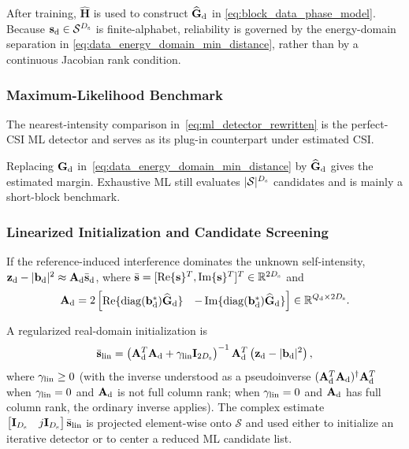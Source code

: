 \documentclass[journal]{IEEEtran}
\begin{document}
After training, $\widehat{\mathbf H}$ is used to construct
$\widehat{\mathbf G}_{\rm d}$ in \eqref{eq:block_data_phase_model}. Because
$\mathbf s_{\rm d}\in\mathcal S^{D_{\rm s}}$ is finite-alphabet, reliability
is governed by the energy-domain separation in
\eqref{eq:data_energy_domain_min_distance}, rather than by a continuous
Jacobian rank condition.

\subsubsection{Maximum-Likelihood Benchmark}

The nearest-intensity comparison in~\eqref{eq:ml_detector_rewritten} is the
perfect-CSI ML detector and serves as its plug-in counterpart under estimated
CSI.

Replacing $\mathbf G_{\rm d}$ in~\eqref{eq:data_energy_domain_min_distance} by
$\widehat{\mathbf G}_{\rm d}$ gives the estimated margin.  Exhaustive ML still
evaluates $|\mathcal S|^{D_{\rm s}}$ candidates and is mainly a short-block
benchmark.

\subsubsection{Linearized Initialization and Candidate Screening}

If the reference-induced interference dominates the unknown self-intensity,
$\mathbf z_{\rm d}-|\mathbf b_{\rm d}|^2\approx\mathbf A_{\rm d}
\bar{\mathbf s}_{\rm d}$, where
$\bar{\mathbf s}=[\operatorname{Re}\{\mathbf s\}^T,
\operatorname{Im}\{\mathbf s\}^T]^T\in\mathbb R^{2D_{\rm s}}$ and
\begin{equation}
\mathbf{A}_{\rm d}
=
2
\begin{bmatrix}
\operatorname{Re}\{\operatorname{diag}(\mathbf{b}_{\rm d}^{*})
\widehat{\mathbf{G}}_{\rm d}\}&
-\operatorname{Im}\{\operatorname{diag}(\mathbf{b}_{\rm d}^{*})
\widehat{\mathbf{G}}_{\rm d}\}
\end{bmatrix}
\in\mathbb R^{Q_{\rm d}\times 2D_{\rm s}}.
\label{eq:linearized_data_matrix}
\end{equation}

A regularized real-domain initialization is
\begin{equation}
\bar{\mathbf{s}}_{\rm lin}
=
\left(
\mathbf{A}_{\rm d}^{T}\mathbf{A}_{\rm d}
+
\gamma_{\rm lin}\mathbf{I}_{2D_{\rm s}}
\right)^{-1}
\mathbf{A}_{\rm d}^{T}
\left(
\mathbf{z}_{\rm d}
-
|\mathbf{b}_{\rm d}|^2
\right),
\label{eq:linearized_data_estimate}
\end{equation}
where $\gamma_{\rm lin}\geq0$ (with the inverse understood as a pseudoinverse
$(\mathbf{A}_{\rm d}^{T}\mathbf{A}_{\rm d})^{\dagger}\mathbf{A}_{\rm d}^{T}$
when $\gamma_{\rm lin}=0$ and $\mathbf{A}_{\rm d}$ is not full column rank;
when $\gamma_{\rm lin}=0$ and $\mathbf{A}_{\rm d}$ has full column rank, the
ordinary inverse applies). The complex estimate
$\begin{bmatrix}\mathbf I_{D_{\rm s}} & j\mathbf I_{D_{\rm s}}\end{bmatrix}\bar{\mathbf s}_{\rm lin}$
is projected element-wise onto $\mathcal S$ and used either to initialize an
iterative detector or to center a reduced ML candidate list.
\end{document}
